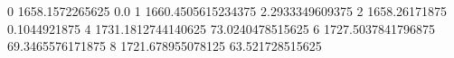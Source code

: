 0 1658.1572265625 0.0
1 1660.4505615234375 2.2933349609375
2 1658.26171875 0.1044921875
4 1731.1812744140625 73.0240478515625
6 1727.5037841796875 69.3465576171875
8 1721.678955078125 63.521728515625
